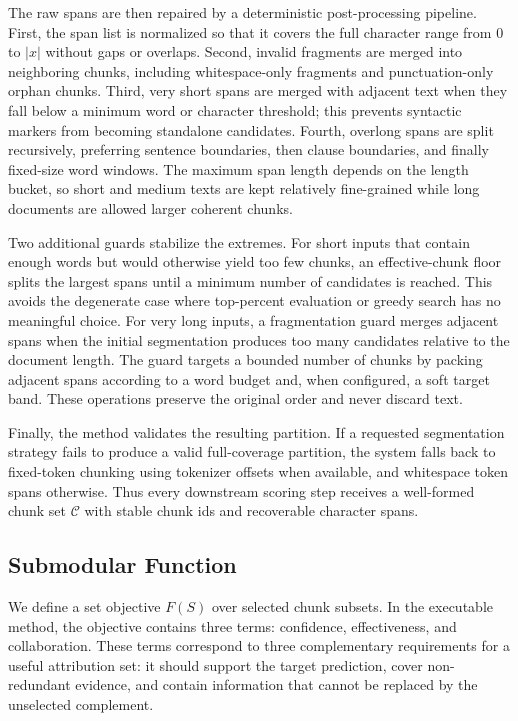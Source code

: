 The raw spans are then repaired by a deterministic post-processing pipeline.
First, the span list is normalized so that it covers the full character range
from $0$ to $|x|$ without gaps or overlaps.  Second, invalid fragments are
merged into neighboring chunks, including whitespace-only fragments and
punctuation-only orphan chunks.  Third, very short spans are merged with
adjacent text when they fall below a minimum word or character threshold; this
prevents syntactic markers from becoming standalone candidates.  Fourth,
overlong spans are split recursively, preferring sentence boundaries, then
clause boundaries, and finally fixed-size word windows.  The maximum span length
depends on the length bucket, so short and medium texts are kept relatively
fine-grained while long documents are allowed larger coherent chunks.

Two additional guards stabilize the extremes.  For short inputs that contain
enough words but would otherwise yield too few chunks, an effective-chunk floor
splits the largest spans until a minimum number of candidates is reached.  This
avoids the degenerate case where top-percent evaluation or greedy search has no
meaningful choice.  For very long inputs, a fragmentation guard merges adjacent
spans when the initial segmentation produces too many candidates relative to the
document length.  The guard targets a bounded number of chunks by packing
adjacent spans according to a word budget and, when configured, a soft target
band.  These operations preserve the original order and never discard text.

Finally, the method validates the resulting partition.  If a requested
segmentation strategy fails to produce a valid full-coverage partition, the
system falls back to fixed-token chunking using tokenizer offsets when
available, and whitespace token spans otherwise.  Thus every downstream scoring
step receives a well-formed chunk set $\mathcal{C}$ with stable chunk ids and
recoverable character spans.

\subsection{Submodular Function}

We define a set objective $F(S)$ over selected chunk subsets.  In the executable
method, the objective contains three terms: confidence, effectiveness, and
collaboration.  These terms correspond to three complementary requirements for
a useful attribution set: it should support the target prediction, cover
non-redundant evidence, and contain information that cannot be replaced by the
unselected complement.

